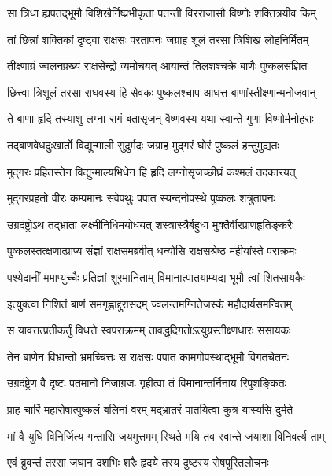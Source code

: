 \twolineshloka
{सा त्रिधा ह्यपतद्भूमौ विशिखैर्निष्प्रभीकृता}
{पतन्ती विरराजासौ विष्णोः शक्तित्रयीव किम्}%

\twolineshloka
{तां छिन्नां शक्तिकां दृष्ट्वा राक्षसः परतापनः}
{जग्राह शूलं तरसा त्रिशिखं लोहनिर्मितम्}%

\twolineshloka
{तीक्ष्णाग्रं ज्वलनप्रख्यं राक्षसेन्द्रो व्यमोचयत्}
{आयान्तं तिलशश्चक्रे बाणैः पुष्कलसंज्ञितः}%

\twolineshloka
{छित्त्वा त्रिशूलं तरसा राघवस्य हि सेवकः}
{पुष्कलश्चाप आधत्त बाणांस्तीक्ष्णान्मनोजवान्}%

\twolineshloka
{ते बाणा हृदि तस्याशु लग्ना रागं बतासृजन्}
{वैष्णवस्य यथा स्वान्ते गुणा विष्णोर्मनोहराः}%

\twolineshloka
{तद्बाणवेधदुःखार्तो विद्युन्माली सुदुर्मदः}
{जग्राह मुद्गरं घोरं पुष्कलं हन्तुमुद्यतः}%

\twolineshloka
{मुद्गरः प्रहितस्तेन विद्युन्माल्यभिधेन हि}
{हृदि लग्नोसृजच्छीघ्रं कश्मलं तदकारयत्}%

\twolineshloka
{मुद्गरप्रहतो वीरः कम्पमानः सवेपथुः}
{पपात स्यन्दनोपस्थे पुष्कलः शत्रुतापनः}%

\twolineshloka
{उग्रदंष्ट्रोऽथ तद्भ्राता लक्ष्मीनिधिमयोधयत्}
{शस्त्रास्त्रैर्बहुधा मुक्तैर्वीरप्राणहृतिङ्करैः}%

\twolineshloka
{पुष्कलस्तत्क्षणात्प्राप्य संज्ञां राक्षसमब्रवीत्}
{धन्योसि राक्षसश्रेष्ठ महीयांस्ते पराक्रमः}%

\twolineshloka
{पश्येदानीं ममाप्युच्चैः प्रतिज्ञां शूरमानिताम्}
{विमानात्पातयाम्यद्य भूमौ त्वां शितसायकैः}%

\twolineshloka
{इत्युक्त्वा निशितं बाणं समगृह्णाद्दुरासदम्}
{ज्वलन्तमग्नितेजस्कं महौदार्यसमन्वितम्}%

\twolineshloka
{स यावत्तत्प्रतीकर्तुं विधत्ते स्वपराक्रमम्}
{तावद्धृदिगतोऽत्युग्रस्तीक्ष्णधारः ससायकः}%

\twolineshloka
{तेन बाणेन विभ्रान्तो भ्रमच्चित्तः स राक्षसः}
{पपात कामगोपस्थाद्भूमौ विगतचेतनः}%

\twolineshloka
{उग्रदंष्ट्रेण वै दृष्टः पतमानो निजाग्रजः}
{गृहीत्वा तं विमानान्तर्निनाय रिपुशङ्कितः}%

\twolineshloka
{प्राह चारिं महारोषात्पुष्कलं बलिनां वरम्}
{मद्भ्रातरं पातयित्वा कुत्र यास्यसि दुर्मते}%

\twolineshloka
{मां वै युधि विनिर्जित्य गन्तासि जयमुत्तमम्}
{स्थिते मयि तव स्वान्ते जयाशा विनिवर्त्य ताम्}%

\twolineshloka
{एवं ब्रुवन्तं तरसा जघान दशभिः शरैः}
{हृदये तस्य दुष्टस्य रोषपूरितलोचनः}%


